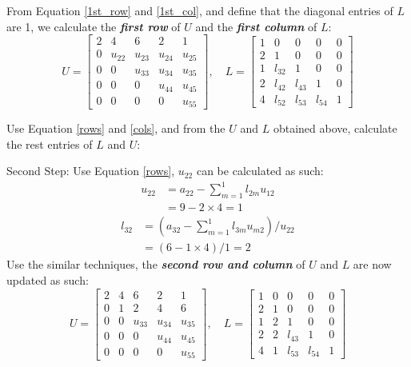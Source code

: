 \documentclass[a4paper,titlepage]{article}
\begin{document}
		From Equation \ref{1st_row} and \ref{1st_col}, and define that the diagonal entries of $L$ are 1, we calculate the \textbf{\textit{first row}} of $U$ and the \textbf{\textit{first column}} of $L$:
		$$
		U = \begin{bmatrix}
			2 & 4 & 6 & 2 & 1\\
			0 & u_{22} & u_{23} & u_{24} & u_{25}\\
			0 & 0 & u_{33} & u_{34} & u_{35}\\
			0 & 0 & 0 & u_{44} & u_{45}\\
			0 & 0 & 0 & 0 & u_{55}
		\end{bmatrix}, \quad
		L = \begin{bmatrix}
			1 & 0 & 0 & 0 & 0\\
			2 & 1 & 0 & 0 & 0\\
			1 & l_{32} & 1 & 0 & 0\\
			2 & l_{42} & l_{43} & 1 & 0\\
			4 & l_{52} & l_{53} & l_{54} & 1
		\end{bmatrix}
		$$
		
		Use Equation \ref{rows} and \ref{cols}, and from the $U$ and $L$ obtained above, calculate the rest entries of $L$ and $U$:
		
		Second Step: Use Equation \ref{rows}, $u_{22}$ can be calculated as such:
		\begin{align*}
			u_{22} &= a_{22} - \sum_{m = 1}^{1}l_{2m}u_{12}\\
			&= 9 - 2\times4 = 1
		\end{align*}
		\begin{align*}
			l_{32} &= (a_{32} - \sum_{m=1}^{1}l_{3m}u_{m2})/u_{22}\\
			&= (6 - 1\times 4) / 1 = 2
		\end{align*}
		Use the similar techniques, the \textbf{\textit{second row and column}} of $U$ and $L$ are now updated as such:
		$$
			U = \begin{bmatrix}
				2 & 4 & 6 & 2 & 1\\
				0 & 1 & 2 & 4 & 6\\
				0 & 0 & u_{33} & u_{34} & u_{35}\\
				0 & 0 & 0 & u_{44} & u_{45}\\
				0 & 0 & 0 & 0 & u_{55}
			\end{bmatrix}, \quad
			L = \begin{bmatrix}
				1 & 0 & 0 & 0 & 0\\
				2 & 1 & 0 & 0 & 0\\
				1 & 2 & 1 & 0 & 0\\
				2 & 2 & l_{43} & 1 & 0\\
				4 & 1 & l_{53} & l_{54} & 1
			\end{bmatrix}
		$$
		
\end{document}
